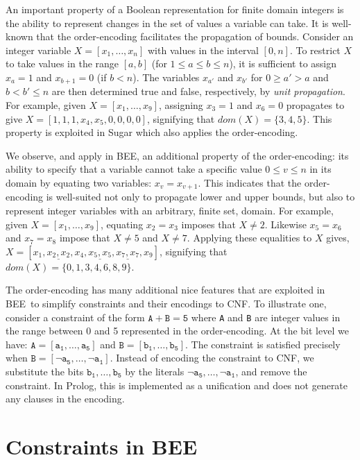 \documentclass{tlp}
\newcommand{\bee}{\textsf{BEE}}
\begin{document}
An important property of a Boolean representation for finite domain
integers is the ability to represent changes in the set of values a
variable can take. 
It is well-known that the order-encoding facilitates the propagation
of bounds. Consider an integer variable $X=[x_1,\ldots,x_n]$ with
values in the interval $[0,n]$.  To restrict $X$ to take values in the
range $[a,b]$ (for $1\leq a\leq b\leq n$), it is sufficient to assign
$x_{a}=1$ and $x_{b+1}=0$ (if $b<n$). The variables $x_{a'}$ and
$x_{b'}$ for $0\geq a'> a$ and $b<b'\leq n$ are then determined true
and false, respectively, by \emph{unit propagation}.  For example, 
given $X=[x_1,\ldots,x_9]$, assigning $x_3=1$ and $x_6=0$ propagates
to give $X=[1,1,1,x_4,x_5,0,0,0,0]$, signifying that
$dom(X)=\{3,4,5\}$.
This property is exploited in Sugar \cite{sugar2009} which also
applies the order-encoding.

We observe, and apply in \bee, an additional property of the
order-encoding: its ability to specify that a variable cannot take a
specific value $0\leq v\leq n$ in its domain by equating two
variables: $x_{v}=x_{v+1}$.
This indicates that the order-encoding is well-suited not only to
propagate lower and upper bounds, but also to represent integer
variables with an arbitrary, finite set, domain.
For example, given $X=[x_1,\ldots,x_9]$, equating $x_2=x_3$ imposes
that $X\neq 2$. Likewise $x_5=x_6$ and $x_7=x_8$ impose that $X\neq 5$
and $X\neq 7$. Applying these equalities to $X$ gives,
$X=[x_1,\underline{x_2,x_2},x_4,\underline{x_5,x_5},\underline{x_7,x_7},x_9]$,
signifying that $dom(X)=\{0,1,3,4,6,8,9\}$.

The order-encoding has many additional nice features that are
exploited in \bee\ to simplify constraints and their encodings to
CNF. To illustrate one, consider a constraint of the form
$\mathtt{A+B=5}$ where \texttt{A} and \texttt{B} are integer values in
the range between 0 and 5 represented in the order-encoding. At the
bit level we have: $\mathtt{A=[a_1,\ldots,a_5]}$ and
$\mathtt{B=[b_1,\ldots,b_5]}$.  The constraint is satisfied precisely
when $\mathtt{B=[\neg a_5,\ldots,\neg a_1]}$. Instead of encoding the
constraint to CNF, we substitute the bits $\mathtt{b_1,\ldots,b_5}$ by
the literals $\mathtt{\neg a_5,\ldots,\neg a_1}$, and remove the
constraint. In Prolog, this is implemented as a unification and does
not generate any clauses in the encoding.



\section{Constraints in \bee}
\end{document}
